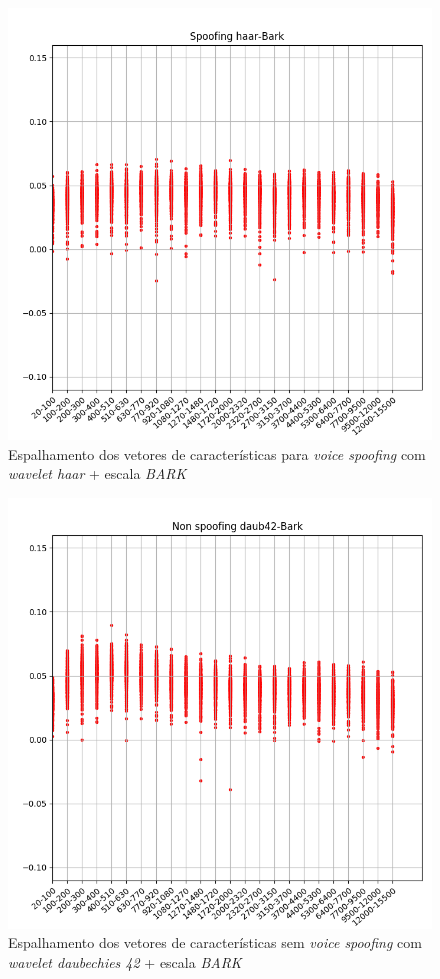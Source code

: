 		\begin{figure}[h]
			\centering
			\includegraphics[width=\linewidth]{images/results/barkVersusMel/spoofingHaarBark}
			\caption{Espalhamento dos vetores de características para \textit{voice spoofing} com \textit{wavelet haar} + escala \textit{BARK} }
			\label{fig:spoofinghaarbark}
		\end{figure}
		\begin{figure}[h]
			\centering
			\includegraphics[width=\linewidth]{images/results/barkVersusMel/liveDaub42Bark}
			\caption{Espalhamento dos vetores de características sem \textit{voice spoofing} com \textit{wavelet daubechies 42} + escala \textit{BARK} }
			\label{fig:livedaub42bark}
		\end{figure}
